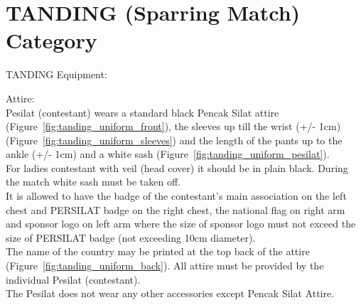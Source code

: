 \section{TANDING (Sparring Match) Category}
\label{sec:tanding_category}

\begin{legal}
\item TANDING Equipment:
    \begin{legal}
    \item Attire: \\

Pesilat (contestant) wears a standard black Pencak Silat attire (Figure~\ref{fig:tanding_uniform_front}), the sleeves up till the wrist (+/- 1cm) (Figure~\ref{fig:tanding_uniform_sleeves}) and the length of the pants up to the ankle (+/- 1cm) and a white sash (Figure~\ref{fig:tanding_uniform_pesilat}). \\

For ladies contestant with veil (head cover) it should be in plain black.  During the match white sash must be taken off.\\

It is allowed to have the badge of the contestant’s main association on the left chest and PERSILAT badge on the right chest, the national flag on right arm and sponsor logo on left arm where the size of sponsor logo must not exceed the size of PERSILAT badge (not exceeding 10cm diameter).\\

The name of the country may be printed at the top back of the attire (Figure~\ref{fig:tanding_uniform_back}). All attire must be provided by the individual Pesilat (contestant).\\

The Pesilat does not wear any other accessories except Pencak Silat Attire.\\



\end{legal}
\end{legal}
